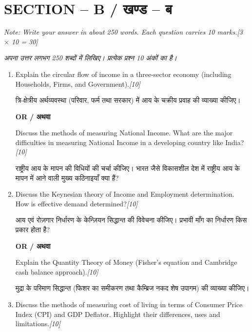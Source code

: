 \documentclass[11pt,a4paper]{article}
\newcommand{\pts}[1]{\hfill \textit{[#1]}}
\begin{document}
\bigskip

\section*{SECTION -- B / खण्ड -- ब}
\noindent \textit{Note: Write your answer in about 250 words. Each question carries 10 marks.}\pts{3 $\times$ 10 = 30}

\noindent \textit{अपना उत्तर लगभग 250 शब्दों में लिखिए। प्रत्येक प्रश्न 10 अंकों का है।}

\begin{enumerate}[label=\textbf{\arabic*.},leftmargin=*,start=2,itemsep=12pt]

  \item Explain the circular flow of income in a three-sector economy (including Households, Firms, and Government).\pts{10}
  
  त्रि-क्षेत्रीय अर्थव्यवस्था (परिवार, फर्म तथा सरकार) में आय के चक्रीय प्रवाह की व्याख्या कीजिए।

  \begin{center}\textbf{OR / अथवा}\end{center}

  Discuss the methods of measuring National Income. What are the major difficulties in measuring National Income in a developing country like India?\pts{10}
  
  राष्ट्रीय आय के मापन की विधियों की चर्चा कीजिए। भारत जैसे विकासशील देश में राष्ट्रीय आय के मापन में आने वाली मुख्य कठिनाइयाँ क्या हैं?

  \item Discuss the Keynesian theory of Income and Employment determination. How is effective demand determined?\pts{10}
  
  आय एवं रोज़गार निर्धारण के केन्ज़ियन सिद्धान्त की विवेचना कीजिए। प्रभावी माँग का निर्धारण किस प्रकार होता है?

  \begin{center}\textbf{OR / अथवा}\end{center}

  Explain the Quantity Theory of Money (Fisher's equation and Cambridge cash balance approach).\pts{10}
  
  मुद्रा के परिमाण सिद्धान्त (फिशर का समीकरण तथा कैम्ब्रिज नकद शेष उपागम) की व्याख्या कीजिए।

  \item Discuss the methods of measuring cost of living in terms of Consumer Price Index (CPI) and GDP Deflator. Highlight their differences, uses and limitations.\pts{10}
  

\end{enumerate}
\end{document}
